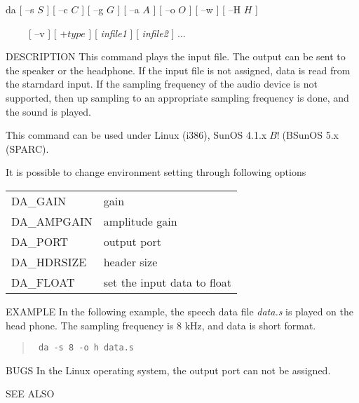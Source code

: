 \begin{synopsis}
\item [da] [ --s $S$ ] [ --c $C$ ] [ --g $G$ ] [ --a $A$ ] [ --o $O$ ] 
	   [ --w ] [ --H $H$ ]
\item [\ ~~~] [ --v ] [ +$type$ ] [ {\em infile1} ] [ {\em infile2} ] ...
\end{synopsis}

\begin{qsection}{DESCRIPTION}
 This command plays the input file.
 The output can be sent to the speaker or the headphone.
 If the input file is not assigned, data is read from the starndard
 input.
 If the sampling frequency of the audio device is not supported,
 then up sampling to an appropriate sampling frequency is done, and
 the sound is played.

 This command can be used under
 Linux (i386), SunOS 4.1.x$B!$(BSunOS 5.x (SPARC).
 
 It is possible to change environment setting through following options
\begin{tabular}{ll}
DA\_GAIN & gain\\
DA\_AMPGAIN & amplitude gain\\
DA\_PORT & output port\\
DA\_HDRSIZE & header size\\
DA\_FLOAT & set the input data to float\\
\end{tabular}

\end{qsection}

\begin{options}
\end{options}

\begin{qsection}{EXAMPLE}
In the following example, the speech data file {\em data.s}
is played on the head phone.
The sampling frequency is 8 kHz, and data is short format.
\begin{quote}
\verb! da -s 8 -o h data.s!
\end{quote}
\end{qsection}

\begin{qsection}{BUGS}
In the Linux operating system, the output port can not be assigned.
\end{qsection}

\begin{qsection}{SEE ALSO}
\end{qsection}

